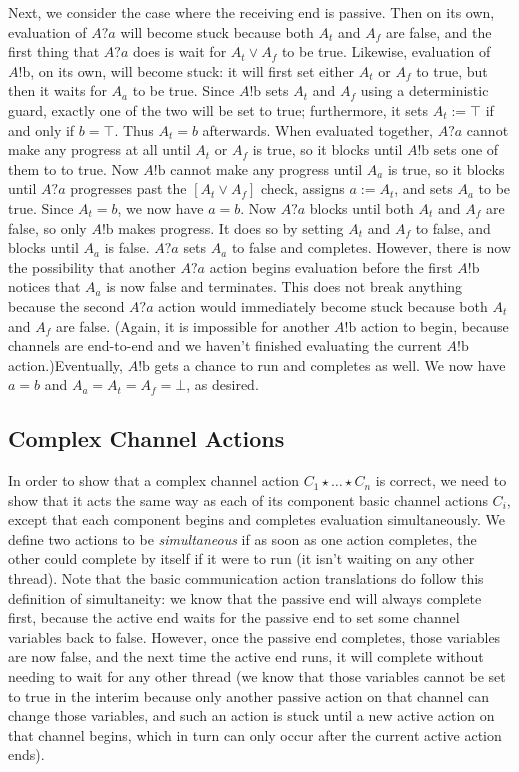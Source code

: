 \documentclass[times, 10pt]{article}
\begin{document}
Next, we consider the case where the receiving end is passive. Then on its own,
evaluation of $A?a$ will become stuck because both $A_t$ and $A_f$ are false,
and the first thing that $A?a$ does is wait for $A_t \vee A_f$ to be true.
Likewise, evaluation of $A!\mathrm{b}$, on its own, will become stuck: it will
first set either $A_t$ or $A_f$ to true, but then it waits for $A_a$ to be true.
Since $A!\mathrm{b}$ sets $A_t$ and $A_f$ using a deterministic guard, exactly one
of the two will be set to true; furthermore, it sets $A_t := \top$ if and only
if $b = \top$. Thus $A_t = b$ afterwards. When evaluated together, $A?a$ cannot
make any progress at all until $A_t$ or $A_f$ is true, so it blocks until
$A!\mathrm{b}$ sets one of them to to true. Now $A!\mathrm{b}$ cannot make any
progress until $A_a$ is true, so it blocks until $A?a$ progresses past the $[A_t
\vee A_f]$ check, assigns $a := A_t$, and sets $A_a$ to be true. Since $A_t =
b$, we now have $a = b$. Now $A?a$ blocks until both $A_t$ and $A_f$ are false,
so only $A!\mathrm{b}$ makes progress. It does so by setting $A_t$ and $A_f$ to
false, and blocks until $A_a$ is false. $A?a$ sets $A_a$ to false and completes.
However, there is now the possibility that another $A?a$ action begins
evaluation before the first $A!\mathrm{b}$ notices that $A_a$ is now false and
terminates. This does not break anything because the second $A?a$ action would
immediately become stuck because both $A_t$ and $A_f$ are false. (Again, it is
impossible for another $A!\mathrm{b}$ action to begin, because channels are
end-to-end and we haven't finished evaluating the current $A!\mathrm{b}$
action.)Eventually, $A!\mathrm{b}$ gets a chance to run and completes as well.
We now have $a = b$ and $A_a = A_t = A_f = \bot$, as desired.

\subsection{Complex Channel Actions}
In order to show that a complex channel action $C_1 \star \ldots \star C_n$ is
correct, we need to show that it acts the same way as each of its component
basic channel actions $C_i$, except that each component begins and completes
evaluation simultaneously. We define two actions to be \textit{simultaneous} if
as soon as one action completes, the other could complete by itself if it were
to run (it isn't waiting on any other thread). Note that the basic communication
action translations do follow this definition of simultaneity: we know that the
passive end will always complete first, because the active end waits for the
passive end to set some channel variables back to false. However, once the
passive end completes, those variables are now false, and the next time the
active end runs, it will complete without needing to wait for any other thread
(we know that those variables cannot be set to true in the interim because only
another passive action on that channel can change those variables, and such an
action is stuck until a new active action on that channel begins, which in turn
can only occur after the current active action ends).
\end{document}
